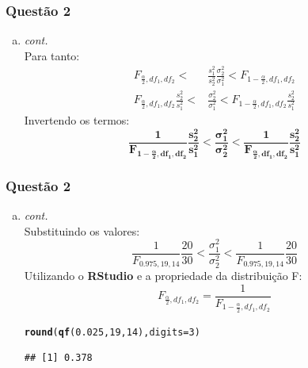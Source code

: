 \documentclass{beamer}\usepackage[]{graphicx}\usepackage[]{color}
\makeatletter
\newcommand{\hlnum}[1]{\textcolor[rgb]{0.686,0.059,0.569}{#1}}%
\newcommand{\hlstd}[1]{\textcolor[rgb]{0.345,0.345,0.345}{#1}}%
\newcommand{\hlkwc}[1]{\textcolor[rgb]{0.333,0.667,0.333}{#1}}%
\newcommand{\hlkwd}[1]{\textcolor[rgb]{0.737,0.353,0.396}{\textbf{#1}}}%
\newenvironment{kframe}{%
 \def\at@end@of@kframe{}%
 \ifinner\ifhmode%
  \def\at@end@of@kframe{\end{minipage}}%
  \begin{minipage}{\columnwidth}%
 \fi\fi%
 \def\FrameCommand##1{\hskip\@totalleftmargin \hskip-\fboxsep
 \colorbox{shadecolor}{##1}\hskip-\fboxsep
     \hskip-\linewidth \hskip-\@totalleftmargin \hskip\columnwidth}%
 \MakeFramed {\advance\hsize-\width
   \@totalleftmargin\z@ \linewidth\hsize
   \@setminipage}}%
 {\par\unskip\endMakeFramed%
 \at@end@of@kframe}
\newenvironment{knitrout}{}{} %
\makeatother
\begin{document}
    	\begin{frame}
	    	\frametitle{Questão 2}
	    	\begin{enumerate}[b)]
	    		\item \textit{cont.}\\
	    			Para tanto:
	    			\begin{align*}
		    			F_{\frac{\alpha}{2},df_{1},df_{2}} < &\frac{s^{2}_{1}}{s^{2}_{2}} \frac{\sigma_{2}^{2}}{\sigma_{1}^{2}} < F_{1-\frac{\alpha}{2},df_{1},df_{2}}\\   
		    			F_{\frac{\alpha}{2},df_{1},df_{2}} \frac{s^{2}_{2}}{s^{2}_{1}}< & \frac{\sigma_{2}^{2}}{\sigma_{1}^{2}} < F_{1-\frac{\alpha}{2},df_{1},df_{2}}\frac{s^{2}_{2}}{s^{2}_{1}}
	    			\end{align*}
	    			Invertendo os termos:$$\boldsymbol{\frac{1}{F_{1-\frac{\alpha}{2},df_{1},df_{2}}}\frac{s^{2}_{2}}{s^{2}_{1}} < \frac{\sigma_{1}^{2}}{\sigma_{2}^{2}} < \frac{1}{F_{\frac{\alpha}{2},df_{1},df_{2}}}\frac{s^{2}_{2}}{s^{2}_{1}}}$$
	    	\end{enumerate}	
    \end{frame}
	
	\begin{frame}[fragile]
		\frametitle{Questão 2}
		\begin{enumerate}[b)]
			\item \textit{cont.}\\
			Substituindo os valores:\\
			$$\frac{1}{F_{0.975,19,14}}\frac{20}{30} < \frac{\sigma_{1}^{2}}{\sigma_{2}^{2}} < \frac{1}{F_{0.975,19,14}}\frac{20}{30}$$
			Utilizando o \textbf{RStudio} e a propriedade da distribuição F:$$F_{\frac{\alpha}{2},df_{1},df_{2}} = \frac{1}{F_{1-\frac{\alpha}{2},df_{1},df_{2}}}$$
\begin{knitrout}
\color{fgcolor}\begin{kframe}
\begin{alltt}
\hlkwd{round}\hlstd{(}\hlkwd{qf}\hlstd{(}\hlnum{0.025}\hlstd{,}\hlnum{19}\hlstd{,}\hlnum{14}\hlstd{),}\hlkwc{digits} \hlstd{=} \hlnum{3}\hlstd{)}
\end{alltt}
\begin{verbatim}
## [1] 0.378
\end{verbatim}
\end{kframe}
\end{knitrout}
			
		\end{enumerate}
	\end{frame}
	
\end{document}

